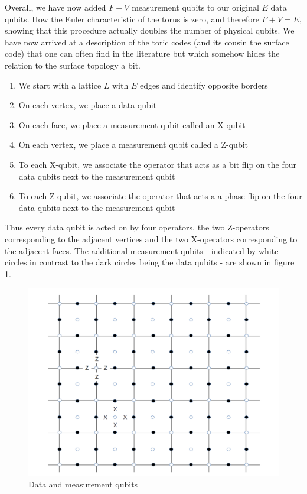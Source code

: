 \documentclass[a4paper, draft]{article}
\theoremstyle{own}
\theoremstyle{remark}
\begin{document}
Overall, we have now added $F + V$ measurement qubits to our original $E$ data qubits. How the Euler characteristic of the torus is zero, and therefore $F + V = E$, showing that this procedure actually doubles the number of physical qubits. We have now arrived at a description of the toric codes (and its cousin the surface code) that one can often find in the literature but which somehow hides the relation to the surface topology a bit.
\begin{enumerate}
	\item We start with a lattice $L$ with $E$ edges and identify opposite borders
	\item On each vertex, we place a data qubit
	\item On each face, we place a measurement qubit called an X-qubit
	\item On each vertex, we place a measurement qubit called a Z-qubit
	\item To each X-qubit, we associate the operator that acts as a bit flip on the four data qubits next to the measurement qubit
	\item To each Z-qubit, we associate the operator that acts a a phase flip on the four data qubits  next to the measurement qubit
\end{enumerate}

Thus every data qubit is acted on by four operators, the two Z-operators corresponding to the adjacent vertices and the two X-operators corresponding to the adjacent faces. The additional measurement qubits - indicated by white circles in contrast to the dark circles being the data qubits - are shown in figure \ref{fig:ToricCodeMeasurementQubits}.

\begin{figure}[ht]
\centering
\includegraphics[width=0.7\linewidth]{images/ToricCodeMeasurementQubits}
\caption[Data and measurement qubits]{Data and measurement qubits}
\label{fig:ToricCodeMeasurementQubits}
\end{figure}
\end{document}
